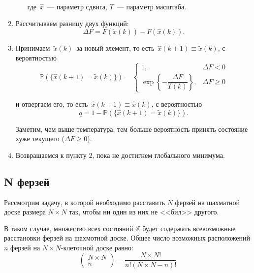 \begin{enumerate}
\begin{enumerate}
		где~$\widehat{x}$~--- параметр сдвига, $T$~--- параметр масштаба.





	\end{enumerate}

	\item Рассчитываем разницу двух функций:
	\[
	\Delta F =
	F(\tilde{x}(k))
	-
	F(\widehat{x}(k)).
	\]

	\item Принимаем~$\tilde{x}(k)$~за новый элемент, то есть~$\widehat{x}(k+1) \equiv \tilde{x}(k)$, с вероятностью
	\begin{equation}
	\mathbb{P}(\{\widehat{x}(k+1) = \tilde{x}(k)\})
	=
	\begin{cases}
	1,
	&
	\Delta F <0
	\\
	\exp
	\left\lbrace
	- \dfrac {\Delta F}{T(k)}
	\right\rbrace ,
	&
	\Delta F \geqslant 0
	\end{cases}
	\end{equation}

	и отвергаем его, то есть~$\widehat{x}(k+1) \equiv \widehat{x}(k)$, с вероятностью
	\[
	q
	=
	1 - \mathbb{P}(\{\widehat{x}(k+1) = \tilde{x}(k)\}).
	\]

	Заметим, чем выше температура, тем больше вероятность принять состояние хуже текущего ($\Delta F \geqslant 0$).

	\item Возвращаемся к пункту 2, пока не достигнем глобального минимума.

\end{enumerate}




\subsection{N ферзей}
\noindent Рассмотрим задачу, в которой необходимо расставить $N$ ферзей на шахматной доске размера $N \times  N$ так, чтобы ни один из них не <<бил>> другого.

В таком случае, множество всех состояний $\mathbb{X}$ будет содержать всевозможные расстановки ферзей на шахмотной доске. Общее число возможных расположений $n$ ферзей на $N \times N$-клеточной доске равно:
\[
{\begin{pmatrix} N \times N  \\ n \end{pmatrix}} = \dfrac{N \times N!}{n! (N \times N - n)!}
\]

